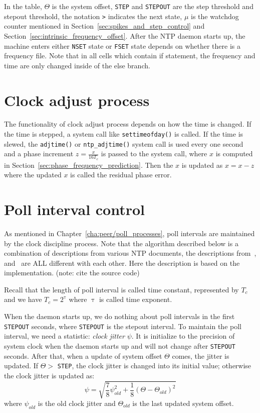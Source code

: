 In the table, $\Theta$ is the system offset, \verb|STEP| and \verb|STEPOUT| are
the step threshold and stepout threshold, the notation \verb|>| indicates the
next state, $\mu$ is the watchdog counter mentioned in
Section~\ref{sec:spikes_and_step_control} and
Section~\ref{sec:intrinsic_frequency_offset}. After the NTP daemon starts up,
the machine enters either \verb|NSET| state or \verb|FSET| state depends on
whether there is a frequency file. Note that in all cells which contain if
statement, the frequency and time are only changed inside of the else branch.

\section{Clock adjust process}%
\label{sec:clock_adjust_process}
The functionality of clock adjust process depends on how the time is changed.
If the time is stepped, a system call like \verb|settimeofday()| is called. If
the time is slewed, the \verb|adjtime()| or \verb|ntp_adjtime()| system call is
used every one second and a phase increment $z=\frac{x}{16T_c}$ is passed to
the system call, where $x$ is computed in
Section~\ref{sec:phase_frequency_prediction}. Then the $x$ is updated as
$x=x-z$ where the updated $x$ is called the residual phase error.

\section{Poll interval control}%
\label{sec:poll_interval_control}
As mentioned in Chapter~\ref{cha:peer/poll_processes}, poll intervals are
maintained by the clock discipline process. Note that the algorithm described
below is a combination of descriptions from various NTP documents, the
descriptions from~\cite{redbook}, \cite{poll_process} and~\cite{rfc5905} are
ALL different with each other. Here the description is based on the
implementation. (note: cite the source code)

Recall that the length of poll interval is called time constant, represented by
$T_c$ and we have $T_c = 2^\uptau$ where $\uptau$ is called time exponent.

When the daemon starts up, we do nothing about poll intervals in the first
\verb|STEPOUT| seconds, where \verb|STEPOUT| is the stepout interval.
To maintain the poll interval, we need a statistic: \emph{clock jitter} $\psi$.
It is initialize to the precision of system clock when the daemon starts up and
will not change after \verb|STEPOUT| seconds. After that, when a update of
system offset $\Theta$ comes, the jitter is updated. If $\Theta > $
\verb|STEP|, the clock jitter is changed into its initial value; otherwise the
clock jitter is updated as:
\begin{equation}
    \psi = \sqrt{ \frac{7}{8}\psi_{old}^2 + \frac{1}{8}\left(\Theta -
    \Theta_{old}\right)^2 }
    \label{eq:clock_jitter}
\end{equation}
where $\psi_{old}$ is the old clock jitter and $\Theta_{old}$ is the last
updated system offset. 

